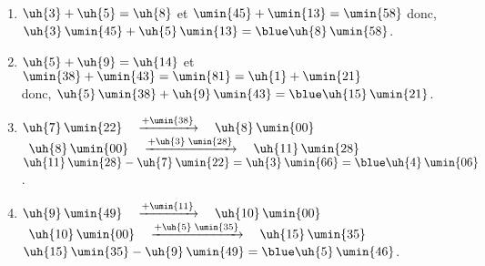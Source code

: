    \ \\ [-5mm]
   \begin{enumerate}
      \item $\uh{3}+\uh{5} =\uh{8}$ et $\umin{45}+\umin{13} =\umin{58}$ donc, $\uh{3}\,\umin{45}+\uh{5}\,\umin{13} =\blue \uh{8}\,\umin{58}$.
      \item $\uh{5}+\uh{9} =\uh{14}$ et \\
         $\umin{38}+\umin{43} =\umin{81} =\uh{1}+\umin{21}$ \\
         donc, $\uh{5}\,\umin{38}+\uh{9}\,\umin{43} =\blue \uh{15}\,\umin{21}$.
      \item $\uh{7}\,\umin{22} \quad \xrightarrow{+\umin{38}} \quad \uh{8}\,\umin{00}$ \\
         \quad\, $\uh{8}\,\umin{00} \quad \xrightarrow{+\uh{3}\;  \umin{28}} \quad \uh{11}\,\umin{28}$ \\
         $\uh{11}\,\umin{28}-\uh{7}\,\umin{22} =\uh{3}\,\umin{66} =\blue \uh{4}\,\umin{06}$.
      \item $\uh{9}\,\umin{49} \quad \xrightarrow{+\umin{11}} \quad \uh{10}\,\umin{00}$ \\
         \quad\, $\uh{10}\,\umin{00} \quad \xrightarrow{+\uh{5} \; \umin{35}} \quad \uh{15}\,\umin{35}$ \\
         $\uh{15}\,\umin{35}-\uh{9}\,\umin{49} =\blue \uh{5}\,\umin{46}$.
   \end{enumerate}

